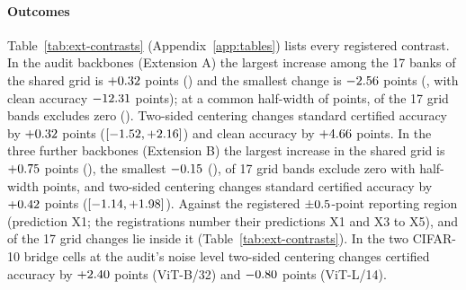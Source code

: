 \paragraph{Outcomes}
Table~\ref{tab:ext-contrasts} (Appendix~\ref{app:tables}) lists every
registered contrast. In the audit
backbones (Extension A) the largest increase among the 17 banks of the shared
grid is $+0.32$ points (\ExtAMaxGridId{}) and the smallest change is
$-2.56$ points (\ExtAMinGridId{}, with clean accuracy
$-12.31$ points); at a common half-width of \ExtACritical{}
points, \ExtAGridExclZero{} of the 17 grid bands excludes zero
(\ExtAGridExclZeroIds{}). Two-sided
centering changes standard certified accuracy by $+0.32$ points
($[-1.52,+2.16]$) and clean accuracy by $+4.66$
points. In the three further backbones (Extension B) the largest increase in the
shared grid is $+0.75$ points (\ExtBMaxGridId{}), the smallest
$-0.15$ (\ExtBMinGridId{}), \ExtBGridExclZero{} of 17 grid
bands exclude zero with half-width \ExtBCritical{} points, and two-sided
centering changes standard certified accuracy by $+0.42$ points
($[-1.14,+1.98]$). Against the registered
$\pm0.5$-point reporting region (prediction X1; the registrations
number their predictions X1 and X3 to X5), \ExtAInsideRegion{} and
\ExtBInsideRegion{} of the 17 grid changes lie inside it
(Table~\ref{tab:ext-contrasts}). In the two CIFAR-10 bridge cells at the
audit's noise level two-sided centering changes certified accuracy by
$+2.40$ points (ViT-B/32) and
$-0.80$ points (ViT-L/14).

